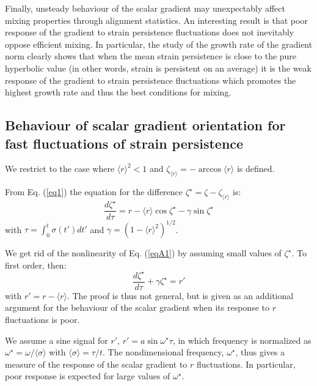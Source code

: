 \documentclass[doublespacing]{elsart}
\begin{document}
Finally,
unsteady behaviour of the
scalar gradient 
may unexpectably
affect
mixing properties 
through alignment statistics.
An interesting result is that
poor
response of the gradient to
strain persistence fluctuations  
does not
inevitably
oppose efficient
mixing.
In particular,
the study
of the growth rate of the gradient norm
clearly shows that
when the mean strain persistence is close to
the pure hyperbolic value 
(in other words, strain is persistent on an average)
it is the
weak
response of the gradient
to strain persistence fluctuations
which promotes
the highest growth rate and thus the best conditions for
mixing. 
\begin{appendix}
\section{Behaviour of scalar gradient orientation
\label{appA}
for fast fluctuations of strain persistence}
We restrict to the case where $ {\langle r \rangle}^2 < 1 $
and $ \zeta_{\langle r \rangle} = -\arccos \langle r \rangle $
is defined.

From Eq. (\ref{eq1}) the equation for the difference
$ \zeta^{\star} = \zeta - \zeta_{\langle r \rangle} $ is:
\begin{equation}
\label{eqA1}
\frac{d \zeta^{\star}}{d \tau}
=
r - \langle r \rangle \cos \zeta^{\star} - \gamma \sin \zeta^{\star}
\end{equation}
with $ \tau = \int_0^t \sigma(t') dt' $ and
$ \gamma = {(1 - {\langle r \rangle}^2)}^{1/2} $.

We get rid of the nonlinearity of Eq. (\ref{eqA1}) by
assuming small values of $ \zeta^{\star} $. 
To first order, then:
\begin{equation}
\label{eqA2}
\frac{d \zeta^{\star}}{d \tau}
+
\gamma \zeta^{\star} = r'
\end{equation}
with $ r' = r - \langle r \rangle $.
The proof is thus not general, but is given as an 
additional
argument for the behaviour of the scalar gradient
when its response to $ r $ fluctuations is poor.

We assume a sine signal for $ r' $,
$ r' = a \sin \omega^{\star} \tau $,
in which frequency 
is normalized as $ \omega^{\star} = \omega/\langle \sigma \rangle $
with $ \langle \sigma \rangle = \tau/t $.
The nondimensional
frequency, $ \omega^{\star} $, 
thus gives a measure of the response 
of the scalar gradient to $ r $ fluctuations.
In particular, poor response is expected for large values
of $ \omega^{\star} $.


\end{appendix}
\end{document}
